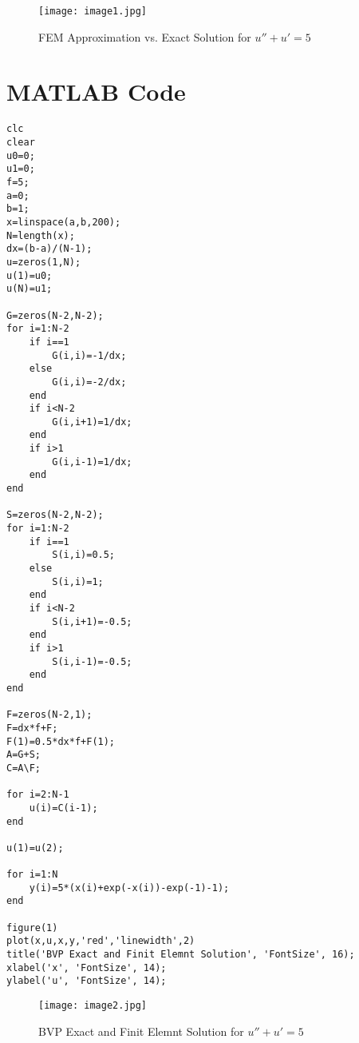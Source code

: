 \documentclass{article}
\begin{document}
\begin{figure}[h!]
    \centering
    \texttt{[image: image1.jpg]}
    \caption{FEM Approximation vs. Exact Solution for $u'' + u' = 5$}
    \label{fig:fem_solution}
\end{figure}

\newpage

\section*{MATLAB Code}


\begin{tcolorbox}[title=Finite Element Method (Piecewise Linear Basis)]
\begin{lstlisting}
clc
clear
u0=0; 
u1=0; 
f=5; 
a=0; 
b=1; 
x=linspace(a,b,200); 
N=length(x); 
dx=(b-a)/(N-1);
u=zeros(1,N);
u(1)=u0;
u(N)=u1;

G=zeros(N-2,N-2); 
for i=1:N-2
    if i==1
        G(i,i)=-1/dx;
    else
        G(i,i)=-2/dx;
    end
    if i<N-2
        G(i,i+1)=1/dx;
    end
    if i>1
        G(i,i-1)=1/dx;
    end
end

S=zeros(N-2,N-2); 
for i=1:N-2
    if i==1
        S(i,i)=0.5;
    else
        S(i,i)=1;
    end
    if i<N-2
        S(i,i+1)=-0.5;
    end
    if i>1
        S(i,i-1)=-0.5;
    end
end

F=zeros(N-2,1);
F=dx*f+F;
F(1)=0.5*dx*f+F(1);
A=G+S;
C=A\F;

for i=2:N-1
    u(i)=C(i-1);
end

u(1)=u(2);

for i=1:N
    y(i)=5*(x(i)+exp(-x(i))-exp(-1)-1);
end

figure(1) 
plot(x,u,x,y,'red','linewidth',2)
title('BVP Exact and Finit Elemnt Solution', 'FontSize', 16);
xlabel('x', 'FontSize', 14);
ylabel('u', 'FontSize', 14);
\end{lstlisting}
\end{tcolorbox}

\begin{figure}[h!]
    \centering
    \texttt{[image: image2.jpg]}
    \caption{BVP Exact and Finit Elemnt Solution for $u'' + u' = 5$}
    \label{fig:fem_solution}
\end{figure}
\end{document}
